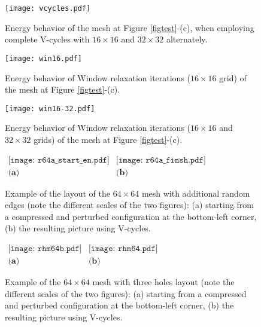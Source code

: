 \documentclass[final]{siamltex}
\begin{document}
\begin{figure}
\vbox{\center\texttt{[image: vcycles.pdf]}}
\caption{Energy behavior of the mesh at Figure \ref{figtest}-(c),
when employing complete V-cycles with $16\times 16$ and $32\times
32$ alternately.}\label{vc-conv}
\end{figure}
\begin{figure}
\vbox{\center\texttt{[image: win16.pdf]}}
\caption{Energy behavior of Window relaxation iterations
($16\times 16$ grid) of the mesh at Figure
\ref{figtest}-(c).}\label{wr-conv}
\end{figure}
\begin{figure}
\vbox{\center\texttt{[image: win16-32.pdf]}}
\caption{Energy behavior of Window relaxation iterations
($16\times 16$ and $32\times 32$ grids) of the mesh at Figure
\ref{figtest}-(c).}\label{wrb-conv}
\end{figure}




\begin{figure}
\begin{center}
$\begin{array}{cc}
      \texttt{[image: r64a\_start\_en.pdf]} &    \texttt{[image: r64a\_finsh.pdf]}\\
      \textbf{(a)} &  \textbf{(b)}
\end{array}$
 \end{center}
  \caption{Example of the layout of the $64\times 64$ mesh with additional random edges
  (note the different scales of the two figures):
  (a) starting from a compressed and perturbed configuration at the bottom-left corner,
  (b) the resulting picture using V-cycles.}
  \label{figm64add}
\end{figure}
\begin{figure}
\begin{center}
$\begin{array}{cc}
      \texttt{[image: rhm64b.pdf]} &    \texttt{[image: rhm64.pdf]}\\
      \textbf{(a)} &  \textbf{(b)}
 \end{array}$
 \end{center}
  \caption{Example of the $64\times 64$ mesh with three holes layout
  (note the different scales of the two figures):
  (a) starting from a compressed and perturbed configuration at the bottom-left corner, (b) the resulting picture using V-cycles.}
  \label{figm64hole}
\end{figure}
\end{document}
